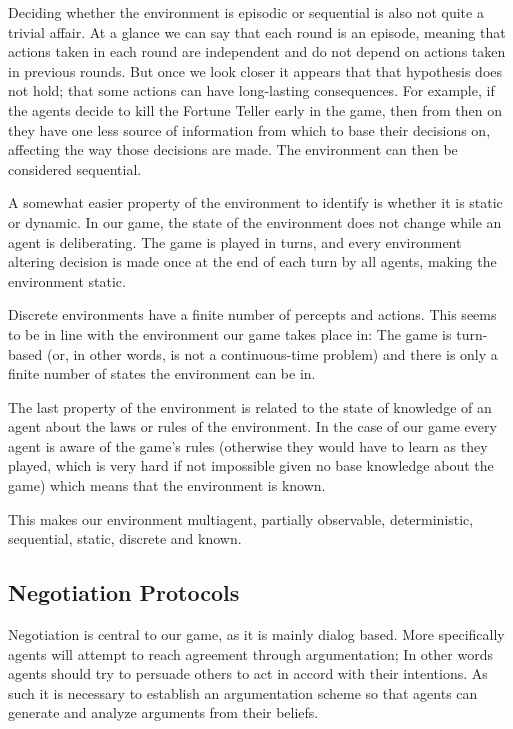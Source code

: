 \documentclass{article}
\begin{document}
Deciding whether the environment is episodic or sequential is also not quite a trivial affair. At a glance we can say that each round is an episode, meaning that actions taken in each round are independent and do not depend on actions taken in previous rounds. But once we look closer it appears that that hypothesis does not hold; that some actions can have long-lasting consequences. For example, if the agents decide to kill the Fortune Teller early in the game, then from then on they have one less source of information from which to base their decisions on, affecting the way those decisions are made. The environment can then be considered sequential.

A somewhat easier property of the environment to identify is whether it is static or dynamic. In our game, the state of the environment does not change while an agent is deliberating. The game is played in turns, and every environment altering decision is made once at the end of each turn by all agents, making the environment static.

Discrete environments have a finite number of percepts and actions. This seems to be in line with the environment our game takes place in: The game is turn-based (or, in other words, is not a continuous-time problem) and there is only a finite number of states the environment can be in. 

The last property of the environment is related to the state of knowledge of an agent about the laws or rules of the environment. In the case of our game every agent is aware of the game's rules (otherwise they would have to learn as they played, which is very hard if not impossible given no base knowledge about the game) which means that the environment is known.

This makes our environment multiagent, partially observable, deterministic, sequential, static, discrete and known.

\subsection{Negotiation Protocols}

Negotiation is central to our game, as it is mainly dialog based. More specifically agents will attempt to reach agreement through argumentation; In other words agents should try to persuade others to act in accord with their intentions. As such it is necessary to establish an argumentation scheme so that agents can generate and analyze arguments from their beliefs.
\end{document}
